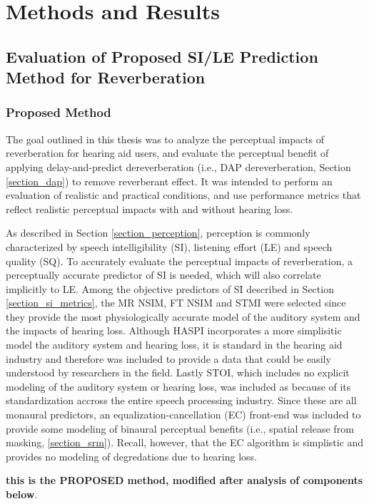 \chapter{Methods and Results}

\section{Evaluation of Proposed SI/LE Prediction Method for Reverberation}

\subsection{Proposed Method}

The goal outlined in this thesis was to analyze the perceptual impacts of reverberation for hearing aid users, and evaluate the perceptual benefit of applying delay-and-predict dereverberation (i.e., DAP dereverberation, Section \ref{section_dap}) to remove reverberant effect. It was intended to perform an evaluation of realistic and practical conditions, and use performance metrics that reflect realistic perceptual impacts with and without hearing loss. 

As described in Section \ref{section_perception}, perception is commonly characterized by speech intelligibility (SI), listening effort (LE) and speech quality (SQ). To accurately evaluate the perceptual impacts of reverberation, a perceptually accurate predictor of SI is needed, which will also correlate implicitly to LE. Among the objective predictors of SI described in Section \ref{section_si_metrics}, the MR NSIM, FT NSIM and STMI were selected since they provide the most physiologically accurate model of the auditory system and the impacts of hearing loss. Although HASPI incorporates a more simplisitic model the auditory system and hearing loss, it is standard in the hearing aid industry and therefore was included to provide a data that could be easily understood by researchers in the field. Lastly STOI, which includes no explicit modeling of the auditory system or hearing loss, was included as because of its standardization accross the entire speech processing industry. Since these are all monaural predictors, an equalization-cancellation (EC) front-end was included to provide some modeling of binaural perceptual benefits (i.e., spatial release from masking, \ref{section_srm}). Recall, however, that the EC algorithm is simplistic and provides no modeling of degredations due to hearing loss.

\textbf{this is the PROPOSED method, modified after analysis of components below}.

